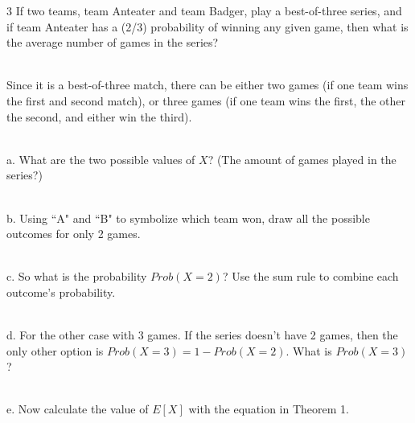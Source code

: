 \documentclass[a4paper,12pt]{book}
\newcounter{question}
\begin{document}
        \begin{question}{\thequestion}{3}
        If two teams, team Anteater and team Badger, play a
        best-of-three series, and if team Anteater has a (2/3)
        probability of winning any given game, then what is the
        average number of games in the series?

        ~\\
        Since it is a best-of-three match, there can be either
        two games (if one team wins the first and second match),
        or three games (if one team wins the first, the other the second, and either win the third).

        ~\\
        a. What are the two possible values of $X$? (The amount of games played in the series?)

        ~\\
        b. Using ``A" and ``B" to symbolize which team won,
        draw all the possible outcomes for only 2 games.

        ~\\
        c. So what is the probability $Prob(X = 2)$? Use the sum rule
        to combine each outcome's probability.

        ~\\
        d. For the other case with 3 games. If the series
        doesn't have 2 games, then the only other option is
        $Prob(X = 3) = 1 - Prob(X=2)$. What is $Prob(X=3)$?

        ~\\
        e. Now calculate the value of $E[X]$ with the equation in Theorem 1.

    \end{question}
\end{document}
